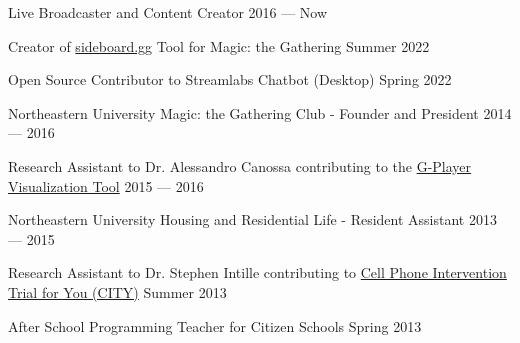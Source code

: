 Live Broadcaster and Content Creator    \hfill 2016 --- Now

Creator of \href{https://sideboard.gg}{sideboard.gg} Tool for Magic: the Gathering \hfill Summer 2022

Open Source Contributor to Streamlabs Chatbot (Desktop) \hfill Spring 2022

Northeastern University Magic: the Gathering Club - Founder and President   \hfill 2014 --- 2016

Research Assistant to Dr. Alessandro Canossa contributing to the \href{https://github.com/spacial-player-data-visualization/g-player-visualization}{G-Player Visualization Tool}   \hfill 2015 --- 2016

Northeastern University Housing and Residential Life - Resident Assistant   \hfill 2013 --- 2015

Research Assistant to Dr. Stephen Intille contributing to \href{https://www.mhealthgroup.org/projects.html}{Cell Phone Intervention Trial for You (CITY)}   \hfill Summer 2013

After School Programming Teacher for Citizen Schools   \hfill Spring 2013

